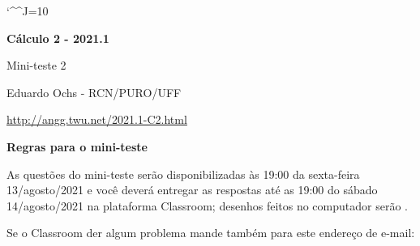 \documentclass[oneside,12pt]{article}
\begin{document}
\catcode`\^^J=10

\pu


\def\drafturl{http://angg.twu.net/LATEX/2021-1-C2.pdf}
\def\drafturl{http://angg.twu.net/2021.1-C2.html}
\def\draftfooter{\tiny \href{\drafturl}{\jobname{}} \ColorBrown{\shorttoday{} \hours}}



%

\thispagestyle{empty}

\begin{center}

\vspace*{1.2cm}

{\bf \Large Cálculo 2 - 2021.1}

\bsk

Mini-teste 2

\bsk

Eduardo Ochs - RCN/PURO/UFF

\url{http://angg.twu.net/2021.1-C2.html}

\end{center}

\newpage


{\bf Regras para o mini-teste}

As questões do mini-teste serão disponibilizadas às 19:00 da
sexta-feira 13/agosto/2021 e você deverá entregar as respostas
 até as 19:00 do sábado 14/agosto/2021 na
plataforma Classroom; dese\-nhos feitos no computador serão
.

Se o Classroom der algum problema mande também para este endereço de
e-mail:
\end{document}
